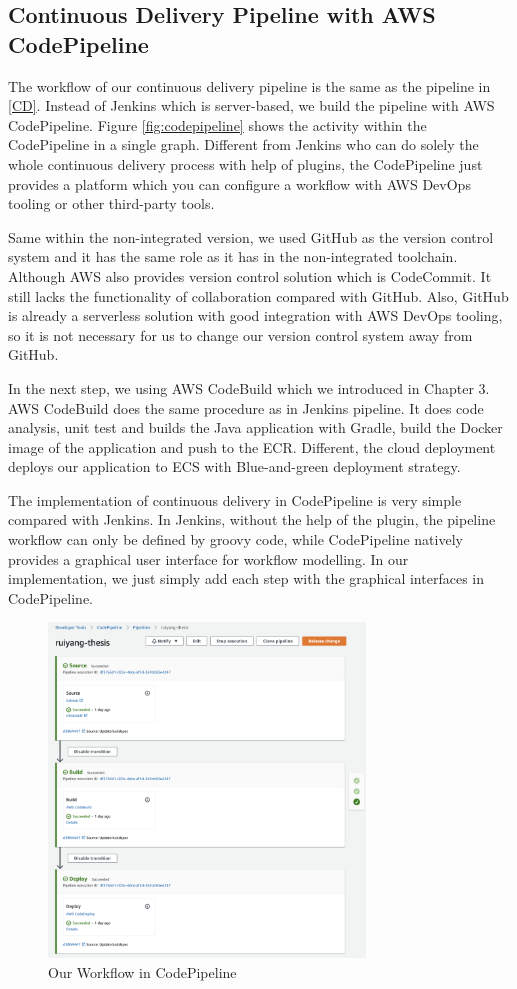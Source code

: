 \subsection{Continuous Delivery Pipeline with AWS CodePipeline}
The workflow of our continuous delivery pipeline is the same as the pipeline in \ref{CD}. Instead of Jenkins which is server-based, we build the pipeline with AWS CodePipeline. Figure \ref{fig:codepipeline} shows the activity within the CodePipeline in a single graph. Different from Jenkins who can do solely the whole continuous delivery process with help of plugins, the CodePipeline just provides a platform which you can configure a workflow with AWS DevOps tooling or other third-party tools. 
\par
Same within the non-integrated version, we used GitHub as the version control system and it has the same role as it has in the non-integrated toolchain. Although AWS also provides version control solution which is CodeCommit. It still lacks the functionality of collaboration compared with GitHub. Also, GitHub is already a serverless solution with good integration with AWS DevOps tooling, so it is not necessary for us to change our version control system away from GitHub. 
\par
In the next step, we using AWS CodeBuild which we introduced in Chapter 3. AWS CodeBuild does the same procedure as in Jenkins pipeline. It does code analysis, unit test and builds the Java application with Gradle, build the Docker image of the application and push to the ECR. Different, the cloud deployment deploys our application to ECS with Blue-and-green deployment strategy.
\par
The implementation of continuous delivery in CodePipeline is very simple compared with Jenkins. In Jenkins, without the help of the plugin, the pipeline workflow can only be defined by groovy code, while CodePipeline natively provides a graphical user interface for workflow modelling. In our implementation, we just simply add each step with the graphical interfaces in CodePipeline.
\begin{figure}[h]
 \centering
 \includegraphics[width=0.75\textwidth]{pics/cp-interface.png}
 \caption{Our Workflow in CodePipeline}
 \label{fig:cp-edit}
\end{figure}
